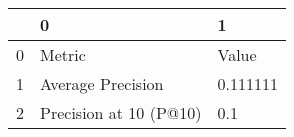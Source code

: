 \begin{tabular}{lll}
\toprule
{} &                       0 &         1 \\
\midrule
0 &                  Metric &     Value \\
1 &       Average Precision &  0.111111 \\
2 &  Precision at 10 (P@10) &       0.1 \\
\bottomrule
\end{tabular}
